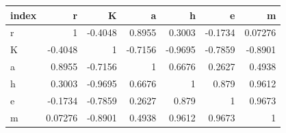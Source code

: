 \begin{tabular}{lrrrrrr}
\toprule
index & r & K & a & h & e & m \\
\midrule
r & 1 & -0.4048 & 0.8955 & 0.3003 & -0.1734 & 0.07276 \\
K & -0.4048 & 1 & -0.7156 & -0.9695 & -0.7859 & -0.8901 \\
a & 0.8955 & -0.7156 & 1 & 0.6676 & 0.2627 & 0.4938 \\
h & 0.3003 & -0.9695 & 0.6676 & 1 & 0.879 & 0.9612 \\
e & -0.1734 & -0.7859 & 0.2627 & 0.879 & 1 & 0.9673 \\
m & 0.07276 & -0.8901 & 0.4938 & 0.9612 & 0.9673 & 1 \\
\bottomrule
\end{tabular}
